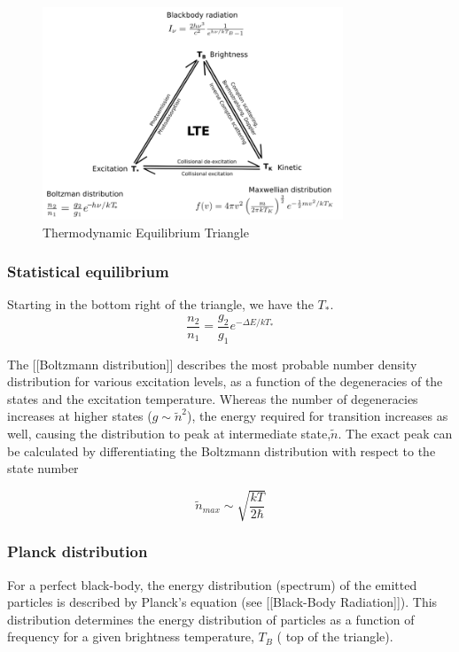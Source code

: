 \documentclass{article}
\begin{document}
\begin{figure}
    \centering
    \includegraphics[width = 0.8\textwidth]{800px-EquilibriaTriangle.png}
    \caption{Thermodynamic Equilibrium Triangle}
    \label{fig:triangle}
\end{figure}


\subsubsection{Statistical equilibrium}
Starting in the bottom right of the triangle, we have the $T_*$.
\begin{equation} 
\frac{n_2}{n_1} = \frac{g_2}{g_1} e^{-\Delta E/kT_*}
\end{equation}

 The [[Boltzmann distribution]] describes the most probable number density distribution for various excitation levels, as a function of the degeneracies of the states and the excitation temperature. Whereas the number of degeneracies increases at higher states ($g \sim \tilde{n}^2$), the energy required for transition increases as well, causing the distribution to peak at intermediate state,$\tilde{n}$. The exact peak can be calculated by differentiating the Boltzmann distribution with respect to the state number 

\begin{equation} 
\tilde{n}_{max} \sim \sqrt{\frac{kT}{2\hbar}}
\end{equation}

\subsubsection{Planck distribution}
For a perfect black-body, the energy distribution (spectrum) of the emitted particles is described by Planck's equation (see [[Black-Body Radiation]]). This distribution determines the energy distribution of particles as a function of frequency for a given brightness temperature, $T_B$ ( top of the triangle). 
\end{document}
